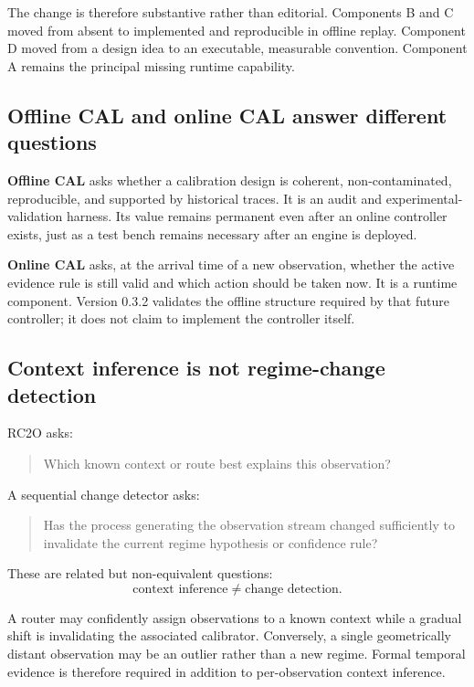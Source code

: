 The change is therefore substantive rather than editorial. Components B and C moved from absent to implemented and reproducible in offline replay. Component D moved from a design idea to an executable, measurable convention. Component A remains the principal missing runtime capability.

\subsection{Offline CAL and online CAL answer different questions}

\textbf{Offline CAL} asks whether a calibration design is coherent, non-contaminated, reproducible, and supported by historical traces. It is an audit and experimental-validation harness. Its value remains permanent even after an online controller exists, just as a test bench remains necessary after an engine is deployed.

\textbf{Online CAL} asks, at the arrival time of a new observation, whether the active evidence rule is still valid and which action should be taken now. It is a runtime component. Version 0.3.2 validates the offline structure required by that future controller; it does not claim to implement the controller itself.

\subsection{Context inference is not regime-change detection}

RC2O asks:
\begin{quote}
Which known context or route best explains this observation?
\end{quote}

A sequential change detector asks:
\begin{quote}
Has the process generating the observation stream changed sufficiently to invalidate the current regime hypothesis or confidence rule?
\end{quote}

These are related but non-equivalent questions:
\begin{equation}
\text{context inference}\neq\text{change detection}.
\end{equation}

A router may confidently assign observations to a known context while a gradual shift is invalidating the associated calibrator. Conversely, a single geometrically distant observation may be an outlier rather than a new regime. Formal temporal evidence is therefore required in addition to per-observation context inference.

